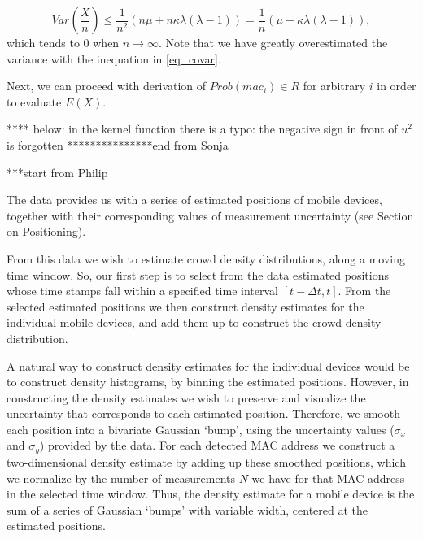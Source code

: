 \documentclass[10pt,a4paper]{article}
\begin{document}
\begin{equation}
Var(\frac{X}{n} ) \leq \frac{1}{n^2}(n \mu + n  \kappa \lambda(\lambda - 1)) = \frac{1}{n}(\mu +  \kappa \lambda(\lambda - 1)), 
\end{equation}
which tends to $0$ when $n \rightarrow \infty$. Note that we have greatly overestimated the variance with the inequation in \eqref{eq_covar}. 

Next, we can proceed with derivation of $Prob(mac_i) \in R$ for arbitrary $i$ in order to evaluate $E(X)$. 
   
**** below: in the kernel function there is a typo:  the negative sign in front of $u^2$ is forgotten
***************end from Sonja

***start from Philip

The data provides us with a series of estimated positions of mobile devices, together with their corresponding values of measurement uncertainty (see Section on Positioning).

From this data we wish to estimate crowd density distributions, along a moving time window.
So, our first step is to select from the data estimated positions whose time stamps fall within a specified time interval $[t-\Delta t,t]$.
From the selected estimated positions we then construct density estimates for the individual mobile devices, and add them up to construct the crowd density distribution.

A natural way to construct density estimates for the individual devices would be to construct density histograms, by binning the estimated positions.
However, in constructing the density estimates we wish to preserve and visualize the uncertainty that corresponds to each estimated position.
Therefore, we smooth each position into a bivariate Gaussian `bump', using the uncertainty values ($\sigma_{x}$ and $\sigma_{y}$) provided by the data.
For each detected MAC address we construct a two-dimensional density estimate by adding up these smoothed positions, which we normalize by the number of measurements $N$ we have for that MAC address in the selected time window.
Thus, the density estimate for a mobile device is the sum of a series of Gaussian `bumps' with variable width, centered at the estimated positions.
\end{document}
